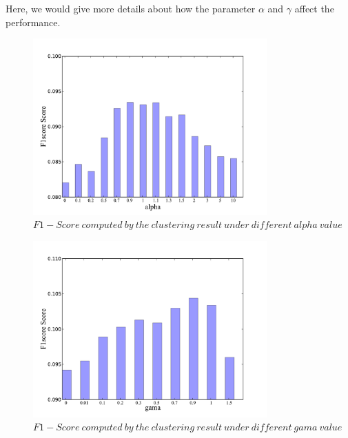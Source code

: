 \documentclass{bmcart}
\begin{document}
Here, we would give more details about how the parameter $\alpha$ and $\gamma$ affect the performance.
\begin{figure}[!h]
  \centering
 \includegraphics[width=0.8\textwidth]{DrawPictures/alpha.pdf}
  \caption{$F1-Score\ computed\ by\ the\ clustering\ result\ under\ different\ alpha\ value\ $}\label{fig:alpha}
\end{figure}
\begin{figure}[!h]
  \centering
 \includegraphics[width=0.8\textwidth]{DrawPictures/gama.pdf}
  \caption{$F1-Score\ computed\ by\ the\ clustering\ result\ under\ different\ gama\ value\ $}\label{fig:gama}
\end{figure}
\end{document}
